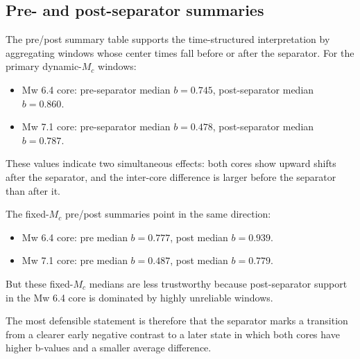 \documentclass[11pt]{article}
\begin{document}
\subsection{Pre- and post-separator summaries}
The pre/post summary table supports the time-structured interpretation by aggregating windows whose center times fall before or after the separator. For the primary dynamic-$M_c$ windows:
\begin{itemize}[leftmargin=1.5em]
    \item Mw 6.4 core: pre-separator median $b=0.745$, post-separator median $b=0.860$.
    \item Mw 7.1 core: pre-separator median $b=0.478$, post-separator median $b=0.787$.
\end{itemize}
These values indicate two simultaneous effects: both cores show upward shifts after the separator, and the inter-core difference is larger before the separator than after it.

The fixed-$M_c$ pre/post summaries point in the same direction:
\begin{itemize}[leftmargin=1.5em]
    \item Mw 6.4 core: pre median $b=0.777$, post median $b=0.939$.
    \item Mw 7.1 core: pre median $b=0.487$, post median $b=0.779$.
\end{itemize}
But these fixed-$M_c$ medians are less trustworthy because post-separator support in the Mw 6.4 core is dominated by highly unreliable windows.

The most defensible statement is therefore that the separator marks a transition from a clearer early negative contrast to a later state in which both cores have higher b-values and a smaller average difference.
\end{document}
